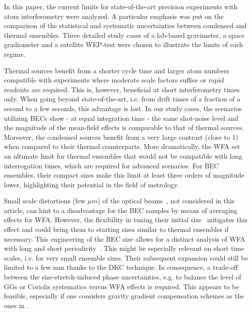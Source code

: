 %
%
In this paper, the current limits for state-of-the-art precision experiments with atom interferometry were analyzed. A particular emphasis was put on the comparison of the statistical and systematic uncertainties between condensed and thermal ensembles. Three detailed study cases of a lab-based gravimeter, a space gradiometer and a satellite WEP-test were chosen to illustrate the limits of each regime.

Thermal sources benefit from a shorter cycle time and larger atom numbers compatible with experiments where moderate scale factors suffice or rapid readouts are required. This is, however, beneficial at short interferometry times only. When going beyond state-of-the-art, i.e. from drift times of a fraction of a second to a few seconds, this advantage is lost.
In our study cases, the scenarios utilizing BECs show - at equal integration time - the same shot-noise level and the magnitude of the mean-field effects is comparable to that of thermal sources. 
Moreover, the condensed sources benefit from a very large contrast (close to 1) when compared to their thermal counterparts. 
More dramatically, the WFA set an ultimate limit for thermal ensembles that would not be compatible with long interrogation times, which are required for advanced scenarios. 
For BEC ensembles, their compact sizes make this limit at least three orders of magnitude lower, highlighting their potential in the field of metrology.

Small scale distortions (few $\mu m$) of the optical beams~\cite{Bade2018}, not considered in this article, can hint to a disadvantage for the BEC samples by means of averaging effects for WFA.
However, the flexibility in tuning their initial size~\cite{Corgier2020} mitigates this effect and could bring them to starting sizes similar to thermal ensembles if necessary. 
This engineering of the BEC size allows for a distinct analysis of WFA with long and short periodicity~\cite{LouchetChauvet2011,Karcher2018}. 
This might be especially relevant on short time scales, i.e. for very small ensemble sizes. Their subsequent expansion could still be limited to a few mm thanks to the DKC technique. 
In consequence, a trade-off between the size-stretch-induced phase uncertainties, e.g. to balance the level of GGs or Coriolis systematics versus WFA effects is required. 
This appears to be feasible, especially if one considers gravity gradient compensation schemes as the ones in \cite{Loriani2020,Trimeche2019,Roura2017}.


